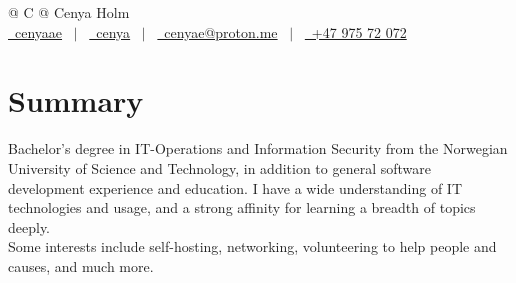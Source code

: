 \documentclass[a4paper,12pt]{article}
\begin{document}
\pagestyle{empty} 



\begin{tabularx}{\linewidth}{@{} C @{}}
\Huge{Cenya Holm} \\[7.5pt]
\href{https://github.com/cenyaae/}{\raisebox{-0.05\height}\faGithub\ cenyaae} \ $|$ \
\href{https://linkedin.com/in/cenya}{\raisebox{-0.05\height}\faLinkedin\ cenya} \ $|$ \ 
\href{mailto:cenyae@proton.me}{\raisebox{-0.05\height}\faEnvelope \ cenyae@proton.me} \ $|$ \ 
\href{tel:+004797572072}{\raisebox{-0.05\height}\faMobile \ +47 975 72 072} \\
\end{tabularx}


\section{Summary}
Bachelor's degree in IT-Operations and Information Security from the Norwegian University of Science and Technology, in addition to general software development experience and education. I have a wide understanding of IT technologies and usage, and a strong affinity for learning a breadth of topics deeply. \\
Some interests include self-hosting, networking, volunteering to help people and causes, and much more.
\end{document}
